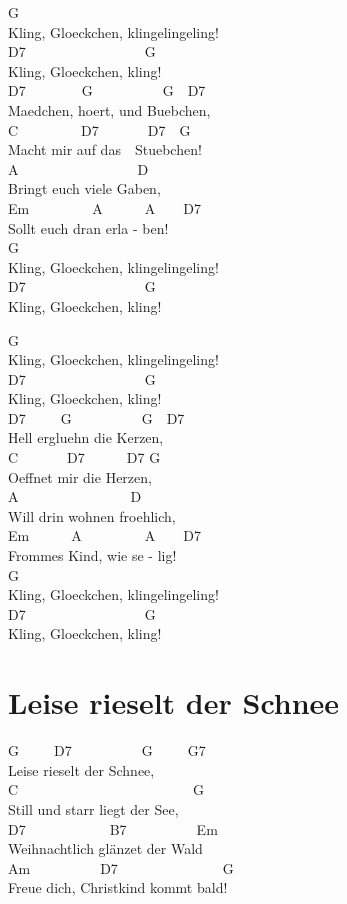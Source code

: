 \documentclass[
  letterpaper,
  twoside=false]{scrbook}
\begin{document}
G\\
Kling, Gloeckchen, klingelingeling!\\
D7~~~~~~~~~~~~~~~~~G\\
Kling, Gloeckchen, kling!\\
D7~~~~~~~~G~~~~~~~~~~G~~D7\\
Maedchen, hoert, und Buebchen,\\
C~~~~~~~~~D7~~~~~~~D7~~G\\
Macht mir auf das~~Stuebchen!\\
A~~~~~~~~~~~~~~~~~D\\
Bringt euch viele Gaben,\\
Em~~~~~~~~~A~~~~~~A~~~~D7\\
Sollt euch dran erla - ben!\\
G\\
Kling, Gloeckchen, klingelingeling!\\
D7~~~~~~~~~~~~~~~~~G\\
Kling, Gloeckchen, kling!~~

G\\
Kling, Gloeckchen, klingelingeling!\\
D7~~~~~~~~~~~~~~~~~G\\
Kling, Gloeckchen, kling!\\
D7~~~~~G~~~~~~~~~~G~~D7\\
Hell ergluehn die Kerzen,\\
C~~~~~~~D7~~~~~~D7 G\\
Oeffnet mir die Herzen,\\
A~~~~~~~~~~~~~~~~D\\
Will drin wohnen froehlich,\\
Em~~~~~~A~~~~~~~~~A~~~~D7\\
Frommes Kind, wie se - lig!\\
G\\
Kling, Gloeckchen, klingelingeling!\\
D7~~~~~~~~~~~~~~~~~G\\
Kling, Gloeckchen, kling!

\hypertarget{leise-rieselt-der-schnee}{%
\chapter{Leise rieselt der Schnee}\label{leise-rieselt-der-schnee}}

G~~~~~D7~~~~~~~~~~G~~~~~G7\\
Leise rieselt der Schnee,\\
C~~~~~~~~~~~~~~~~~~~~~~~~~G\\
Still und starr liegt der See,\\
D7~~~~~~~~~~~~B7~~~~~~~~~~Em\\
Weihnachtlich glänzet der Wald\\
Am~~~~~~~~~~D7~~~~~~~~~~~~~~~G\\
Freue dich, Christkind kommt bald!
\end{document}
